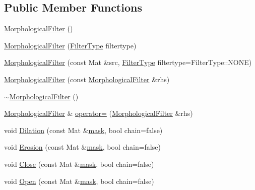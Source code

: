 \subsection*{Public Member Functions}
\begin{DoxyCompactItemize}
\item 
\hyperlink{class_vision_1_1_morphological_filter_a86da6e12018a61c610942cee292a5b16}{Morphological\+Filter} ()
\item 
\hyperlink{class_vision_1_1_morphological_filter_adee61b49563bbab5c62699ce3b66f61d}{Morphological\+Filter} (\hyperlink{class_vision_1_1_morphological_filter_a1f19c9cb13f0d68778c77d6fd0370868}{Filter\+Type} filtertype)
\item 
\hyperlink{class_vision_1_1_morphological_filter_a629a6d6a08e47bad397dea88506ee18a}{Morphological\+Filter} (const Mat \&src, \hyperlink{class_vision_1_1_morphological_filter_a1f19c9cb13f0d68778c77d6fd0370868}{Filter\+Type} filtertype=Filter\+Type\+::\+N\+O\+N\+E)
\item 
\hyperlink{class_vision_1_1_morphological_filter_a097b3c98f3ae5d18caece09e76e4d466}{Morphological\+Filter} (const \hyperlink{class_vision_1_1_morphological_filter}{Morphological\+Filter} \&rhs)
\item 
\hyperlink{class_vision_1_1_morphological_filter_aa5d02af08a53911fb24d60d1a842e7cb}{$\sim$\+Morphological\+Filter} ()
\item 
\hyperlink{class_vision_1_1_morphological_filter}{Morphological\+Filter} \& \hyperlink{class_vision_1_1_morphological_filter_ac470002738b85326278c76538ba5a0b8}{operator=} (\hyperlink{class_vision_1_1_morphological_filter}{Morphological\+Filter} \&rhs)
\item 
void \hyperlink{class_vision_1_1_morphological_filter_abfba03324b8dd0280925463941345417}{Dilation} (const Mat \&\hyperlink{_gen_blob_8m_a2f6787d513f2bdbca6833c1c1ee04329}{mask}, bool chain=false)
\item 
void \hyperlink{class_vision_1_1_morphological_filter_a62ad82519dc19be6367193a5d539c98b}{Erosion} (const Mat \&\hyperlink{_gen_blob_8m_a2f6787d513f2bdbca6833c1c1ee04329}{mask}, bool chain=false)
\item 
void \hyperlink{class_vision_1_1_morphological_filter_ad18de4b3b27d7cd0465cd7f8c3d0b52f}{Close} (const Mat \&\hyperlink{_gen_blob_8m_a2f6787d513f2bdbca6833c1c1ee04329}{mask}, bool chain=false)
\item 
void \hyperlink{class_vision_1_1_morphological_filter_a5e57dd85a3c583242b62c5669deab9a0}{Open} (const Mat \&\hyperlink{_gen_blob_8m_a2f6787d513f2bdbca6833c1c1ee04329}{mask}, bool chain=false)
\end{DoxyCompactItemize}
